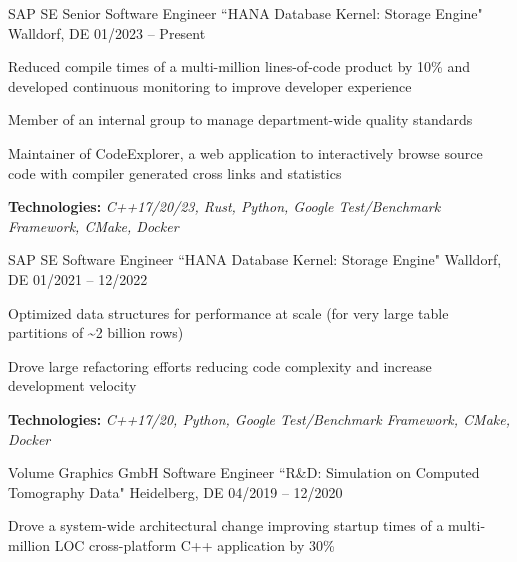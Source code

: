 \vspace{-2.0mm}
\begin{cventries}
  \cventry
    {SAP SE}
    {Senior Software Engineer ``HANA Database Kernel: Storage Engine"}
    {Walldorf, DE}
    {01/2023 -- Present}
    {
      \begin{cvitems}
        \item {Reduced compile times of a multi-million lines-of-code product by 10\% and developed continuous monitoring to improve developer experience}
        \item {Member of an internal group to manage department-wide quality standards}
        \item {Maintainer of CodeExplorer, a web application to interactively browse source code with compiler generated cross links and statistics}
        \item {\textbf{Technologies:} \textit{C++17/20/23, Rust, Python, Google Test/Benchmark Framework, CMake, Docker}}
      \end{cvitems}
    }
  \cventry
    {SAP SE}
    {Software Engineer ``HANA Database Kernel: Storage Engine"}
    {Walldorf, DE}
    {01/2021 -- 12/2022}
    {
      \begin{cvitems}
        \item {Optimized data structures for performance at scale (for very large table partitions of \textasciitilde 2 billion rows)}
        \item {Drove large refactoring efforts reducing code complexity and increase development velocity}
        \item {\textbf{Technologies:} \textit{C++17/20, Python, Google Test/Benchmark Framework, CMake, Docker}}
      \end{cvitems}
    }
  \cventry
    {Volume Graphics GmbH}
    {Software Engineer ``R\&D: Simulation on Computed Tomography Data"}
    {Heidelberg, DE}
    {04/2019 -- 12/2020}
    {
      \begin{cvitems}
        \item {Drove a system-wide architectural change improving startup times of a multi-million LOC cross-platform C++ application by 30\%}

\end{cvitems}}
\end{cventries}
